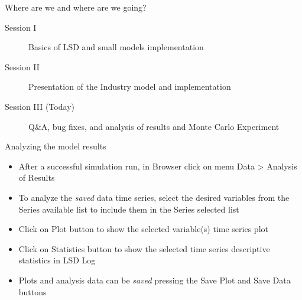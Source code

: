 \documentclass[bigger,aspectratio=169]{beamer}
\begin{document}
\begin{frame}[label={sec:org8cfd0a0}]{Where are we and where are we going?}
\begin{description}
\item[{Session I}] Basics of LSD and small models implementation
\item[{Session II}] Presentation of the Industry model and implementation
\item[{Session III (Today)}] Q\&A, bug fixes, and analysis of results and Monte Carlo Experiment
\end{description}
\end{frame}
\begin{frame}[label={sec:orge2b7674}]{Analyzing the model results}
\begin{itemize}
\item After a successful simulation run, in \alert{Browser} click on menu \alert{Data > Analysis of Results}
\item To analyze the \emph{saved} data time series, select the desired variables from the \alert{Series available} list to include them in the \alert{Series selected} list
\item Click on \alert{Plot} button to show the selected variable(s) time series plot
\item Click on \alert{Statistics} button to show the selected time series descriptive statistics in \alert{LSD Log}
\item Plots and analysis data can be \emph{saved} pressing the \alert{Save Plot} and \alert{Save Data} buttons
\end{itemize}
\end{frame}
\end{document}
